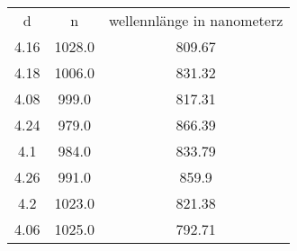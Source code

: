 \begin{table}
\begin{tabular}{ccc}
d & n & wellennlänge in nanometerz \\
4.16 & 1028.0 & 809.67 \\
4.18 & 1006.0 & 831.32 \\
4.08 & 999.0 & 817.31 \\
4.24 & 979.0 & 866.39 \\
4.1 & 984.0 & 833.79 \\
4.26 & 991.0 & 859.9 \\
4.2 & 1023.0 & 821.38 \\
4.06 & 1025.0 & 792.71 \\
\end{tabular}
\end{table}

